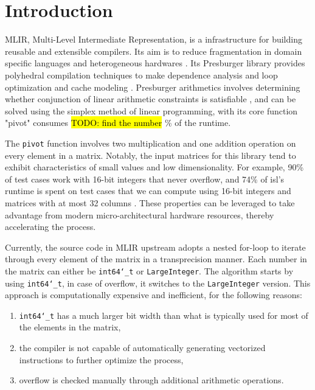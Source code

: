 \documentclass[logo,bsc,singlespacing,parskip]{infthesis}
\newcommand{\dtlong}{\texttt{int64\char`_t}}
\begin{document}
\chapter{Introduction}
\label{sec:introduction}

MLIR, Multi-Level Intermediate Representation, is a infrastructure for building
reusable and extensible compilers. Its aim is to reduce fragmentation in domain
specific languages and heterogeneous hardwares \cite{mlir}. Its Presburger
library provides polyhedral compilation techniques to make dependence analysis
and loop optimization \cite{mliraffine} and cache modeling \cite{CacheModel}.
Presburger arithmetics involves determining whether conjunction of linear
arithmetic constraints is satisfiable \cite{SMLPPA}, and can be solved using the
simplex method of linear programming, with its core function "pivot" consumes
\hl{TODO: find the number} \% \cite{FPL1} of the runtime. 

The \texttt{pivot} function involves two multiplication and one addition
operation on every element in a matrix. Notably, the input matrices for this
library tend to exhibit characteristics of small values and low dimensionality.
For example, 90\% of test cases work with 16-bit integers that never overflow,
and 74\% of isl’s runtime is spent on test cases that we can compute using
16-bit integers and matrices with at most 32 columns \cite{FPL2}. These
properties can be leveraged to take advantage from modern micro-architectural
hardware resources, thereby accelerating the process.

Currently, the source code in MLIR upstream adopts a nested for-loop to iterate
through every element of the matrix in a transprecision manner. Each number in
the matrix can either be \dtlong{} or \texttt{LargeInteger}. The
algorithm starts by using \dtlong{}, in case of overflow, it switches to
the \texttt{LargeInteger} version. This approach is computationally expensive
and inefficient, for the following reasons: 
\begin{enumerate}

\item \dtlong{} has a much larger bit width than what is typically
used for most of the elements in the matrix,

\item the compiler is not capable of automatically generating vectorized
instructions to further optimize the process,

\item overflow is checked manually through additional arithmetic
operations.

\end{enumerate}
\end{document}
